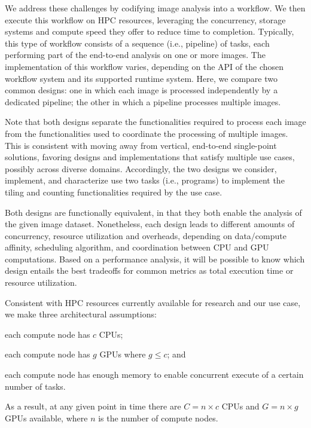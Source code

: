 We address these challenges by codifying image analysis into a workflow. We
then execute this workflow on HPC resources, leveraging the concurrency,
storage systems and compute speed they offer to reduce time to completion.
Typically, this type of workflow consists of a sequence (i.e., pipeline) of
tasks, each performing part of the end-to-end analysis on one or more images.
The implementation of this workflow varies, depending on the API of the
chosen workflow system and its supported runtime system. Here, we compare two
common designs: one in which each image is processed independently by a
dedicated pipeline; the other in which a pipeline processes multiple images.

Note that both designs separate the functionalities required to process each 
image from the functionalities used to coordinate the processing of multiple 
images. This is consistent with moving away from vertical, end-to-end  
single-point solutions, favoring designs and implementations that satisfy 
multiple use cases, possibly across diverse domains. Accordingly, the two 
designs we consider, implement, and characterize use two tasks (i.e., 
programs) to implement the tiling and counting functionalities required by 
the use case.

Both designs are functionally equivalent, in that they both enable the
analysis of the given image dataset. Nonetheless, each design leads to
different amounts of concurrency, resource utilization and overheads,
depending on data/compute affinity, scheduling algorithm, and coordination
between CPU and GPU computations. Based on a performance analysis, it will be
possible to know which design entails the best tradeoffs for common metrics
as total execution time or resource utilization.

Consistent with HPC resources currently available for research and our use 
case, we make three architectural assumptions: 
\begin{inparaenum}[(1)]
	\item each compute node has $c$ CPUs;
	\item each compute node has $g$ GPUs where $g \le c$; and
	\item each compute node has enough memory to enable concurrent execute of
	a certain number of tasks.
\end{inparaenum}
As a result, at any given point in time there are $C = n\times c$ CPUs and $G
= n\times g$ GPUs available, where $n$ is the number of compute nodes.

